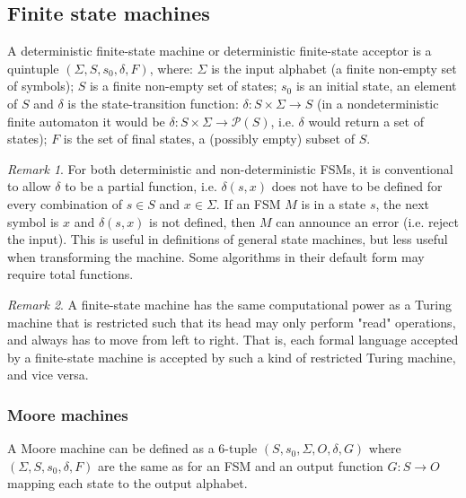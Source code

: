 \documentclass{scrartcl}
\theoremstyle{definition}
\theoremstyle{remark}
\newtheorem{remark}{Remark}
\begin{document}
\citep{vanderschaft2004bisimulation}

\citep{vanderschaft2004equivalence}

\subsection{Finite state machines}

A deterministic finite-state machine or deterministic finite-state acceptor is a quintuple $(\Sigma ,S,s_{0},\delta,F)$, where: $\Sigma$  is the input alphabet (a finite non-empty set of symbols); $S$ is a finite non-empty set of states; $s_{0}$ is an initial state, an element of $S$ and $\delta$  is the state-transition function: 
$\delta :S\times \Sigma \rightarrow S$ (in a nondeterministic finite automaton it would be $\delta :S\times \Sigma \rightarrow {\mathcal {P}}(S)$, i.e. $\delta$  would return a set of states); $F$ is the set of final states, a (possibly empty) subset of $S$.


\begin{remark}
For both deterministic and non-deterministic FSMs, it is conventional to allow  $\delta$  to be a partial function, i.e. $\delta (s,x)$ does not have to be defined for every combination of $s\in S$ and $x\in \Sigma$. If an FSM $M$ is in a state $s$, the next symbol is $x$ and $\delta (s,x)$ is not defined, then $M$ can announce an error (i.e. reject the input). This is useful in definitions of general state machines, but less useful when transforming the machine. Some algorithms in their default form may require total functions.
\end{remark}


\begin{remark}
A finite-state machine has the same computational power as a Turing machine that is restricted such that its head may only perform "read" operations, and always has to move from left to right. That is, each formal language accepted by a finite-state machine is accepted by such a kind of restricted Turing machine, and vice versa.
\end{remark}


\subsubsection{Moore machines}%

A Moore machine can be defined as a 6-tuple  $(S,s_{0},\Sigma ,O,\delta ,G)$ where $(\Sigma ,S,s_{0},\delta ,F)$ are the same as for an FSM and 
an output function $G:S\rightarrow O$ mapping each state to the output alphabet.
\end{document}
